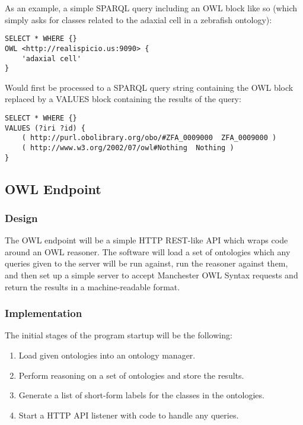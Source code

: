 \documentclass{article}
\begin{document}
As an example, a simple SPARQL query including an OWL block like so (which
simply asks for classes related to the adaxial cell in a zebrafish ontology):

\begin{lstlisting}
SELECT * WHERE {}
OWL <http://realispicio.us:9090> {
    'adaxial cell'
}
\end{lstlisting}

Would first be processed to a SPARQL query string containing the OWL block
replaced by a VALUES block containing the results of the query:

\begin{lstlisting}
SELECT * WHERE {} 
VALUES (?iri ?id) { 
    ( http://purl.obolibrary.org/obo/#ZFA_0009000  ZFA_0009000 ) 
    ( http://www.w3.org/2002/07/owl#Nothing  Nothing )
}
\end{lstlisting}

\subsection{OWL Endpoint}

\subsubsection{Design}

The OWL endpoint will be a simple HTTP REST-like API which wraps code around an
OWL reasoner. The software will load a set of ontologies which any queries given
to the server will be run against, run the reasoner against them, and then set
up a simple server to accept Manchester OWL Syntax requests and return the
results in a machine-readable format.

\subsubsection{Implementation}

The initial stages of the program startup will be the following:

\begin{enumerate}
    \item Load given ontologies into an ontology manager. 
    \item Perform reasoning on a set of ontologies and store the results.
    \item Generate a list of short-form labels for the classes in the
    ontologies.
    \item Start a HTTP API listener with code to handle any queries.
\end{enumerate}
\end{document}

